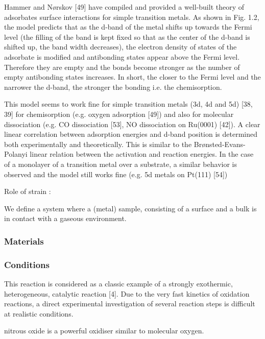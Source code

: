 Hammer and Nørskov [49] have compiled and provided a well-built theory of adsorbates
surface interactions for simple transition metals. As shown in Fig. 1.2, the model predicts that as the d-band of the metal shifts up towards the Fermi level (the filling of the band is kept fixed so that as the center of the d-band is shifted up, the band width decreases), the electron density of states of the adsorbate is modified and antibonding states appear above the Fermi level. Therefore they are empty and the bonds become stronger as the number of empty antibonding states increases. In short, the closer to the Fermi level and the narrower the d-band, the stronger the bonding i.e. the chemisorption.

This model seems to work fine for simple transition metals (3d, 4d and 5d) [38, 39] for chemisorption (e.g. oxygen adsorption [49]) and also for molecular dissociation (e.g. CO
dissociation [53], NO dissociation on Ru(0001) [42]). A clear linear correlation between adsorption energies and d-band position is determined both experimentally and theoretically. This is similar to the Brønsted-Evans-Polanyi linear relation between the activation and reaction energies. In the case of a monolayer of a transition metal over a substrate, a similar behavior is observed and the model still works fine (e.g. 5d metals on Pt(111) [54])


Role of strain : 

\cite{Kitchin2004}

\cite{Mavrikakis1998}

We define a system where a (metal) sample, consisting of a surface and a bulk is in contact with a gaseous environment.




\subsubsection{Materials}

\subsubsection{Conditions}

This reaction is considered as a classic example of a strongly exothermic, heterogeneous, catalytic reaction [4]. Due to the very fast kinetics of oxidation reactions, a direct experimental investigation of several reaction steps is difficult at realistic conditions.

nitrous oxide is a powerful oxidiser similar to molecular oxygen. 

